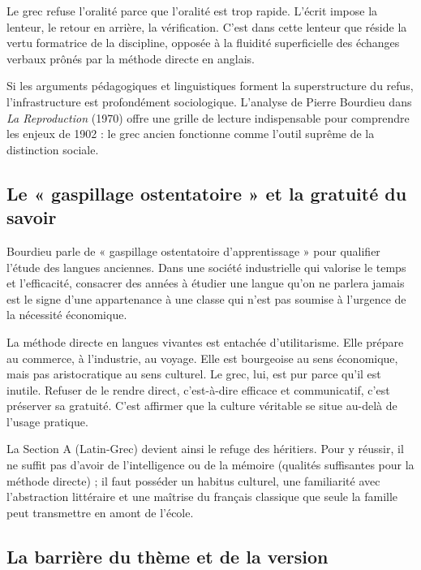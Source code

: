 Le grec refuse l'oralité parce que l'oralité est trop rapide. L'écrit impose la lenteur, le retour
en arrière, la vérification. C'est dans cette lenteur que réside la vertu formatrice de la
discipline, opposée à la fluidité superficielle des échanges verbaux prônés par la méthode directe
en anglais.

Si les arguments pédagogiques et linguistiques forment la superstructure du refus, l'infrastructure
est profondément sociologique. L'analyse de Pierre Bourdieu dans \textit{La Reproduction} (1970)
offre une grille de lecture indispensable pour comprendre les enjeux de 1902 : le grec ancien
fonctionne comme l'outil suprême de la distinction sociale.\cite{I-2-2-ref4}



\subsection{Le « gaspillage ostentatoire » et la gratuité du savoir}

Bourdieu parle de « gaspillage ostentatoire d'apprentissage » pour qualifier l'étude des langues
anciennes.\cite{I-2-2-ref4} Dans une société industrielle qui valorise le temps et l'efficacité,
consacrer des années à étudier une langue qu'on ne parlera jamais est le signe d'une appartenance à
une classe qui n'est pas soumise à l'urgence de la nécessité économique.

La méthode directe en langues vivantes est entachée d'utilitarisme. Elle prépare au commerce, à
l'industrie, au voyage. Elle est \og bourgeoise\fg{} au sens économique, mais pas \og
aristocratique\fg{} au sens culturel. Le grec, lui, est pur parce qu'il est inutile. Refuser de le
rendre \og direct\fg{}, c'est-à-dire efficace et communicatif, c'est préserver sa gratuité. C'est
affirmer que la culture véritable se situe au-delà de l'usage pratique.

La Section A (Latin-Grec) devient ainsi le refuge des héritiers. Pour y réussir, il ne suffit pas
d'avoir de l'intelligence ou de la mémoire (qualités suffisantes pour la méthode directe) ; il faut
posséder un habitus culturel, une familiarité avec l'abstraction littéraire et une maîtrise du
français classique que seule la famille peut transmettre en amont de l'école.\cite{I-2-2-ref4}



\subsection{La barrière du thème et de la version}

